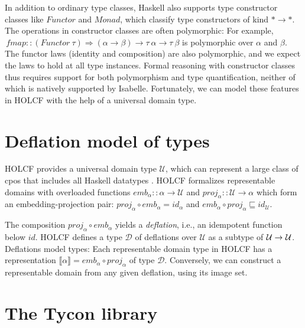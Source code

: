 \documentclass{sigplanconf}
\newcommand{\To}{\mathbin{\Rightarrow}}
\newcommand{\U}{\ensuremath{\mathcal{U}}}
\newcommand{\D}{\ensuremath{\mathcal{D}}}
\newcommand{\REP}[1]{\ensuremath{\llbracket#1\rrbracket}}
\newcommand{\hair}{\mskip1mu}
\newcommand{\hsc}[1]{\ensuremath{\mathit{#1}}}
\newcommand{\hsid}{\hsc{id}}
\newcommand{\hsemb}{\hsc{emb}}
\newcommand{\hsproj}{\hsc{proj}}
\newcommand{\fmap}{\,\hsc{fmap}} %
\newcommand{\tA}{\alpha}
\newcommand{\tB}{\beta}
\newcommand{\tT}{\tau}
\theoremstyle{definition}
\begin{document}

In addition to ordinary type classes, Haskell also supports type constructor classes like \hsc{Functor} and \hsc{Monad}, which classify type constructors of kind $*\to*$.
The operations in constructor classes are often polymorphic: For example, $\fmap :: (\hsc{Functor}\:\tT) \To (\tA \to \tB) \to \tT\:\tA \to \tT\:\tB$ is polymorphic over $\tA$ and $\tB$. The functor laws (identity and composition) are also polymorphic, and we expect the laws to hold at all type instances.
Formal reasoning with constructor classes thus requires support for both polymorphism and type quantification, neither of which is natively supported by Isabelle. Fortunately, we can model these features in HOLCF with the help of a universal domain type.

\section{Deflation model of types}
\label{sec:deflation-model}

HOLCF provides a universal domain type $\U$, which can represent a large class of cpos that includes all Haskell datatypes \cite{Huffman2009}. HOLCF formalizes representable domains with overloaded functions $\hsemb_\alpha :: \tA \to \U$ and $\hsproj_\alpha :: \U \to \tA$ which form an embedding-projection pair: $\hsproj_\alpha \circ \hsemb_\alpha = id_\alpha$ and $\hsemb_\alpha \circ \hsproj_\alpha \sqsubseteq \hsid_\U$.

The composition $\hsproj_\alpha \circ \hsemb_\alpha$ yields a \emph{deflation}, i.e., an idempotent function below $\hsid$. HOLCF defines a type $\D$ of deflations over $\U$ as a subtype of $\U\to\hair\U$. Deflations model types: Each representable domain type in HOLCF has a representation $\REP{\tA} = \hsemb_\tA \circ \hsproj_\tA$ of type $\D$. Conversely, we can construct a representable domain from any given deflation, using its image set.

\section{The Tycon library}
\end{document}
